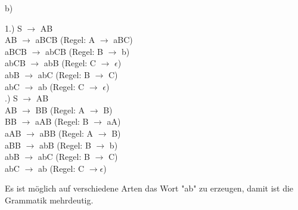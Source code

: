 \documentclass[11pt,a4paper]{article}
\begin{document}
b)
\begin{center}
    1.) S $\rightarrow$ AB \\
    AB $\rightarrow$ aBCB (Regel: A $\rightarrow$ aBC) \\
    aBCB $\rightarrow$ abCB (Regel: B $\rightarrow$ b) \\
    abCB $\rightarrow$ abB (Regel: C $\rightarrow$ $\epsilon$) \\
    abB $\rightarrow$ abC (Regel: B $\rightarrow$ C) \\
    abC $\rightarrow$ ab (Regel: C $\rightarrow$ $\epsilon$) \\
    .) S $\rightarrow$ AB \\
    AB $\rightarrow$ BB (Regel: A $\rightarrow$ B)\\
    BB $\rightarrow$ aAB (Regel: B $\rightarrow$ aA)\\
    aAB $\rightarrow$ aBB (Regel: A $\rightarrow$ B)\\
    aBB $\rightarrow$ abB (Regel: B $\rightarrow$ b) \\
    abB $\rightarrow$ abC (Regel: B $\rightarrow$ C) \\
    abC $\rightarrow$ ab (Regel: C $\rightarrow$$ \epsilon$)
\end{center}

Es ist möglich auf verschiedene Arten das Wort "ab" zu erzeugen, damit ist die Grammatik mehrdeutig.
\end{document}
